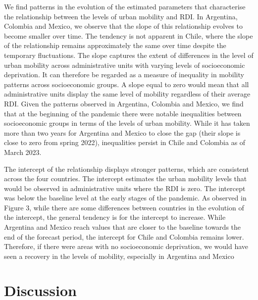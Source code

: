 \documentclass[
  11pt,
]{article}
\begin{document}
We find patterns in the evolution of the estimated parameters that
characterise the relationship between the levels of urban mobility and
RDI. In Argentina, Colombia and Mexico, we observe that the slope of
this relationship evolves to become smaller over time. The tendency is
not apparent in Chile, where the slope of the relationship remains
approximately the same over time despite the temporary fluctuations. The
slope captures the extent of differences in the level of urban mobility
across administrative units with varying levels of socioeconomic
deprivation. It can therefore be regarded as a measure of inequality in
mobility patterns across socioeconomic groups. A slope equal to zero
would mean that all administrative units display the same level of
mobility regardless of their average RDI. Given the patterns observed in
Argentina, Colombia and Mexico, we find that at the beginning of the
pandemic there were notable inequalities between socioeconomic groups in
terms of the levels of urban mobility. While it has taken more than two
years for Argentina and Mexico to close the gap (their slope is close to
zero from spring 2022), inequalities persist in Chile and Colombia as of
March 2023.

The intercept of the relationship displays stronger patterns, which are
consistent across the four countries. The intercept estimates the urban
mobility levels that would be observed in administrative units where the
RDI is zero. The intercept was below the baseline level at the early
stages of the pandemic. As observed in Figure 3, while there are some
differences between countries in the evolution of the intercept, the
general tendency is for the intercept to increase. While Argentina and
Mexico reach values that are closer to the baseline towards the end of
the forecast period, the intercept for Chile and Colombia remains lower.
Therefore, if there were areas with no socioeconomic deprivation, we
would have seen a recovery in the levels of mobility, especially in
Argentina and Mexico

\hypertarget{sec-discussion}{%
\section{Discussion}\label{sec-discussion}}
\end{document}
